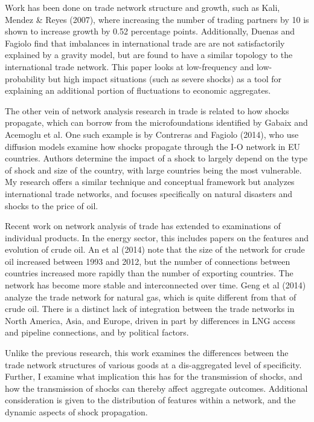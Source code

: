 \documentclass[10pt,letterpaper,pdftex]{article}
\begin{document}
Work has been done on trade network structure and growth, such as Kali, Mendez \& Reyes (2007), where increasing the number of trading partners by 10 is shown to increase growth by 0.52 percentage points. Additionally, Duenas and Fagiolo find that imbalances in international trade are are not satisfactorily explained by a gravity model, but are found to have a similar topology to the international trade network. This paper looks at low-frequency and low-probability but high impact situations (such as severe shocks) as a tool for explaining an additional portion of fluctuations to economic aggregates.

The other vein of network analysis research in trade is related to how shocks propagate, which can borrow from the microfoundations identified by Gabaix and Acemoglu et al. One such example is by Contreras and Fagiolo (2014), who use diffusion models examine how shocks propagate through the I-O network in EU countries. Authors determine the impact of a shock to largely depend on the type of shock and size of the country, with large countries being the most vulnerable. My research offers a similar technique and conceptual framework but analyzes international trade networks, and focuses specifically on natural disasters and shocks to the price of oil.

Recent work on network analysis of trade has extended to examinations of individual products. In the energy sector, this includes papers on the features and evolution of crude oil. An et al (2014) note that the size of the network for crude oil increased between 1993 and 2012, but the number of connections between countries increased more rapidly than the number of exporting countries. The network has become more stable and interconnected over time. Geng et al (2014) analyze the trade network for natural gas, which is quite different from that of crude oil. There is a distinct lack of integration between the trade networks in North America, Asia, and Europe, driven in part by differences in LNG access and pipeline connections, and by political factors.  

Unlike the previous research, this work examines the differences between the trade network structures of various goods at a dis-aggregated level of specificity. Further, I examine what implication this has for the transmission of shocks, and how the transmission of shocks can thereby affect aggregate outcomes. Additional consideration is given to the distribution of features within a network, and the dynamic aspects of shock propagation.
\end{document}
